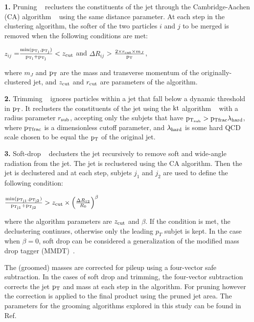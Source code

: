 {\bf 1. }Pruning ~\cite{Ellis:2009me} reclusters the constituents of the jet through the Cambridge-Aachen (CA) algorithm ~\cite{Dasgupta:2013ihk} using the same distance parameter.  
At each step in the clustering algorithm, the softer of the two particles $i$ and $j$ to be merged is removed when the following conditions are met:
 

$z_{ij}$ =$ \frac{{\rm min}(\rm p_{T_{i}}, p_{T_{j}})}{\rm p_{T_{i}} + p_{T_{j}}} < z_{\rm cut}$ and 
$\Delta R_{ij}$ >  $\frac{2 \times r_{\rm cut} \times m_{J}}{\rm p_{T}} $,

where $m_{J}$ and $\rm p_{T}$ are the mass and transverse momentum of the originally-clustered jet, and $z_{\rm cut}$ and $r_{\rm cut}$ are parameters of the algorithm.

{\bf 2. }Trimming ~\cite{Krohn:2009th} ignores particles within a jet that fall below a dynamic threshold in $\rm p_{T}$. 
It reclusters the constituents of the jet using the $\rm kt$ algorithm ~\cite{Cacciari:2008gp} with a radius parameter $r_{\rm sub}$, accepting only the subjets that have $\rm p_{T_{\rm sub}} > p_{Tfrac} \lambda_{\rm hard}$, where $\rm p_{Tfrac}$ is a dimensionless cutoff parameter, and $\lambda_{\rm hard}$ is some hard QCD scale chosen to be equal the $\rm p_{T}$ of the original jet. 

{\bf 3. }Soft-drop ~\cite{Larkoski:2014wba}  declusters the jet recursively to remove soft and wide-angle radiation from the jet.
The jet is reclustered using the CA algorithm.  Then the jet is declustered and at each step, subjets $j_{1}$ and $j_{2}$ are used to define the following condition:

$\frac{{\rm min}(\rm p_{T_{j1}},\rm p_{T_{j2}})}{\rm p_{T_{j1}}+p_{T_{j2}}} > z_{\rm cut} \times \left( \frac{\Delta R_{12}}{R_0} \right)^{\beta}$

where the algorithm parameters are $z_{\rm cut}$ and $\beta$.
If the condition is met, the declustering continues, otherwise only the leading $p_{T}$ subjet is kept.
In the case when $\beta=0$, soft drop can be considered a generalization of the modified mass drop tagger (MMDT)~\cite{Dasgupta:2013ihk}. 


The (groomed) masses are corrected for pileup using a four-vector safe subtraction. %
In the cases of soft drop and trimming, the four-vector subtraction corrects the jet $\rm p_{T}$ and mass at each step in the algorithm.
For pruning however the correction is applied to the final product using the pruned jet area. 
The parameters for the grooming algorithms explored in this study can be found in Ref.~\cite{JMEPAS} %


